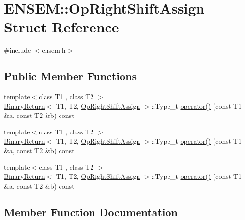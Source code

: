 \hypertarget{structENSEM_1_1OpRightShiftAssign}{}\section{E\+N\+S\+EM\+:\+:Op\+Right\+Shift\+Assign Struct Reference}
\label{structENSEM_1_1OpRightShiftAssign}


{\ttfamily \#include $<$ensem.\+h$>$}

\subsection*{Public Member Functions}
\begin{DoxyCompactItemize}
\item 
{\footnotesize template$<$class T1 , class T2 $>$ }\\\mbox{\hyperlink{structENSEM_1_1BinaryReturn}{Binary\+Return}}$<$ T1, T2, \mbox{\hyperlink{structENSEM_1_1OpRightShiftAssign}{Op\+Right\+Shift\+Assign}} $>$\+::Type\+\_\+t \mbox{\hyperlink{structENSEM_1_1OpRightShiftAssign_a9ff0eba54a134afd57441ec8450a745e}{operator()}} (const T1 \&a, const T2 \&b) const
\item 
{\footnotesize template$<$class T1 , class T2 $>$ }\\\mbox{\hyperlink{structENSEM_1_1BinaryReturn}{Binary\+Return}}$<$ T1, T2, \mbox{\hyperlink{structENSEM_1_1OpRightShiftAssign}{Op\+Right\+Shift\+Assign}} $>$\+::Type\+\_\+t \mbox{\hyperlink{structENSEM_1_1OpRightShiftAssign_a9ff0eba54a134afd57441ec8450a745e}{operator()}} (const T1 \&a, const T2 \&b) const
\item 
{\footnotesize template$<$class T1 , class T2 $>$ }\\\mbox{\hyperlink{structENSEM_1_1BinaryReturn}{Binary\+Return}}$<$ T1, T2, \mbox{\hyperlink{structENSEM_1_1OpRightShiftAssign}{Op\+Right\+Shift\+Assign}} $>$\+::Type\+\_\+t \mbox{\hyperlink{structENSEM_1_1OpRightShiftAssign_a9ff0eba54a134afd57441ec8450a745e}{operator()}} (const T1 \&a, const T2 \&b) const
\end{DoxyCompactItemize}


\subsection{Member Function Documentation}
\mbox{\label{structENSEM_1_1OpRightShiftAssign_a9ff0eba54a134afd57441ec8450a745e}} 
